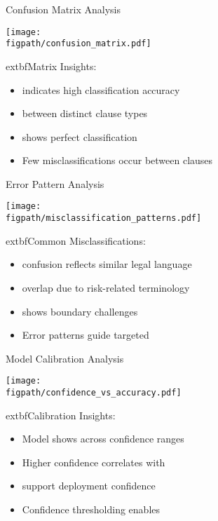\begin{frame}{Confusion Matrix Analysis}
\begin{center}
\texttt{[image: \\figpath/confusion\_matrix.pdf]}
\end{center}

	extbf{Matrix Insights:}
\begin{itemize}
    \item {} indicates high classification accuracy
    \item {} between distinct clause types
    \item {} shows perfect classification
    \item Few misclassifications occur between  clauses
\end{itemize}
\end{frame}

\begin{frame}{Error Pattern Analysis}
\begin{center}
\texttt{[image: \\figpath/misclassification\_patterns.pdf]}
\end{center}

	extbf{Common Misclassifications:}
\begin{itemize}
    \item {} confusion reflects similar legal language
    \item {} overlap due to risk-related terminology
    \item {} shows boundary challenges
    \item Error patterns guide targeted 
\end{itemize}
\end{frame}

\begin{frame}{Model Calibration Analysis}
\begin{center}
\texttt{[image: \\figpath/confidence\_vs\_accuracy.pdf]}
\end{center}

	extbf{Calibration Insights:}
\begin{itemize}
    \item Model shows  across confidence ranges
    \item Higher confidence correlates with 
    \item {} support deployment confidence
    \item Confidence thresholding enables 
\end{itemize}
\end{frame}

